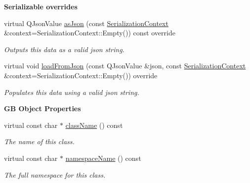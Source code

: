 \begin{Indent}\textbf{ Serializable overrides}\par
\begin{DoxyCompactItemize}
\item 
\mbox{\label{classrev_1_1_animation_controller_ab42f5f6ffa1cae25539eb5214e1ef162}} 
virtual Q\+Json\+Value \mbox{\hyperlink{classrev_1_1_animation_controller_ab42f5f6ffa1cae25539eb5214e1ef162}{as\+Json}} (const \mbox{\hyperlink{structrev_1_1_serialization_context}{Serialization\+Context}} \&context=Serialization\+Context\+::\+Empty()) const override
\begin{DoxyCompactList}\small\item\em Outputs this data as a valid json string. \end{DoxyCompactList}\item 
\mbox{\label{classrev_1_1_animation_controller_afcdbc146686b6db040eed8d0b6adcaaf}} 
virtual void \mbox{\hyperlink{classrev_1_1_animation_controller_afcdbc146686b6db040eed8d0b6adcaaf}{load\+From\+Json}} (const Q\+Json\+Value \&json, const \mbox{\hyperlink{structrev_1_1_serialization_context}{Serialization\+Context}} \&context=Serialization\+Context\+::\+Empty()) override
\begin{DoxyCompactList}\small\item\em Populates this data using a valid json string. \end{DoxyCompactList}\end{DoxyCompactItemize}
\end{Indent}
\begin{Indent}\textbf{ GB Object Properties}\par
\begin{DoxyCompactItemize}
\item 
virtual const char $\ast$ \mbox{\hyperlink{classrev_1_1_animation_controller_a242d8be4d5939baeda4cde95c13cd1ef}{class\+Name}} () const
\begin{DoxyCompactList}\small\item\em The name of this class. \end{DoxyCompactList}\item 
virtual const char $\ast$ \mbox{\hyperlink{classrev_1_1_animation_controller_aa20837e4b8c3730c3a66bc84e2524b02}{namespace\+Name}} () const
\begin{DoxyCompactList}\small\item\em The full namespace for this class. \end{DoxyCompactList}\end{DoxyCompactItemize}
\end{Indent}
